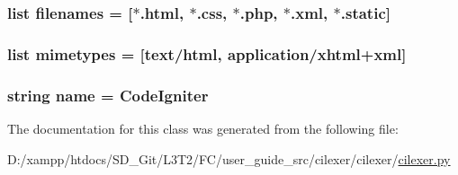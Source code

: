 \subsubsection[{filenames}]{\setlength{\rightskip}{0pt plus 5cm}list filenames = \mbox{[}\textquotesingle{}$\ast$.html\textquotesingle{}, \textquotesingle{}$\ast$.css\textquotesingle{}, \textquotesingle{}$\ast$.php\textquotesingle{}, \textquotesingle{}$\ast$.xml\textquotesingle{}, \textquotesingle{}$\ast$.static\textquotesingle{}\mbox{]}\hspace{0.3cm}{\ttfamily [static]}}\label{classcilexer_1_1cilexer_1_1_code_igniter_lexer_ad63fcc40a3fb08841c9f0b5cee5741ee}
\hypertarget{classcilexer_1_1cilexer_1_1_code_igniter_lexer_a580daf9337ffa2ec48c5c36585da00ed}{}
\subsubsection[{mimetypes}]{\setlength{\rightskip}{0pt plus 5cm}list mimetypes = \mbox{[}\textquotesingle{}text/html\textquotesingle{}, \textquotesingle{}application/xhtml+xml\textquotesingle{}\mbox{]}\hspace{0.3cm}{\ttfamily [static]}}\label{classcilexer_1_1cilexer_1_1_code_igniter_lexer_a580daf9337ffa2ec48c5c36585da00ed}
\hypertarget{classcilexer_1_1cilexer_1_1_code_igniter_lexer_a8ccf841cb59e451791bcb2e1ac4f1edc}{}
\subsubsection[{name}]{\setlength{\rightskip}{0pt plus 5cm}string name = \textquotesingle{}Code\+Igniter\textquotesingle{}\hspace{0.3cm}{\ttfamily [static]}}\label{classcilexer_1_1cilexer_1_1_code_igniter_lexer_a8ccf841cb59e451791bcb2e1ac4f1edc}


The documentation for this class was generated from the following file\+:\begin{DoxyCompactItemize}
\item 
D\+:/xampp/htdocs/\+S\+D\+\_\+\+Git/\+L3\+T2/\+F\+C/user\+\_\+guide\+\_\+src/cilexer/cilexer/\hyperlink{cilexer_8py}{cilexer.\+py}\end{DoxyCompactItemize}
